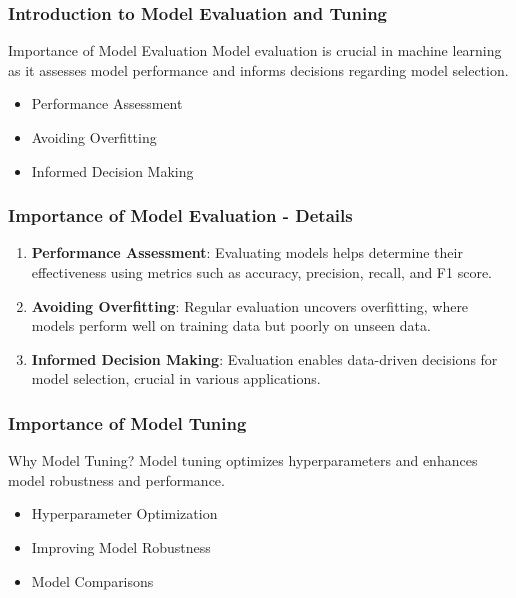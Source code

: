 \documentclass[aspectratio=169]{beamer}
\begin{document}
\frame{\titlepage}

\begin{frame}[fragile]
    \frametitle{Introduction to Model Evaluation and Tuning}
    \begin{block}{Importance of Model Evaluation}
        Model evaluation is crucial in machine learning as it assesses model performance and informs decisions regarding model selection.
    \end{block}
    \begin{itemize}
        \item Performance Assessment
        \item Avoiding Overfitting
        \item Informed Decision Making
    \end{itemize}
\end{frame}

\begin{frame}[fragile]
    \frametitle{Importance of Model Evaluation - Details}
    \begin{enumerate}
        \item \textbf{Performance Assessment}: Evaluating models helps determine their effectiveness using metrics such as accuracy, precision, recall, and F1 score.
        \item \textbf{Avoiding Overfitting}: Regular evaluation uncovers overfitting, where models perform well on training data but poorly on unseen data.
        \item \textbf{Informed Decision Making}: Evaluation enables data-driven decisions for model selection, crucial in various applications.
    \end{enumerate}
\end{frame}

\begin{frame}[fragile]
    \frametitle{Importance of Model Tuning}
    \begin{block}{Why Model Tuning?}
        Model tuning optimizes hyperparameters and enhances model robustness and performance.
    \end{block}
    \begin{itemize}
        \item Hyperparameter Optimization
        \item Improving Model Robustness
        \item Model Comparisons
    \end{itemize}
\end{frame}
\end{document}
